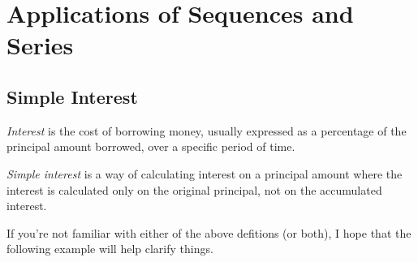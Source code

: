 \chapter{Applications of Sequences and Series}

\section{Simple Interest}

\begin{definition}[Interest]
  \textit{Interest} is the cost of borrowing money, usually expressed as a percentage of the principal amount
  borrowed, over a specific period of time.
\end{definition}

\begin{definition}
  \textit{Simple interest} is a way of calculating interest on a principal amount
  where the interest is calculated only on the original principal, not on the accumulated interest.
\end{definition}

If you're not familiar with either of the above defitions (or both), I hope that 
the following example will help clarify things. 

